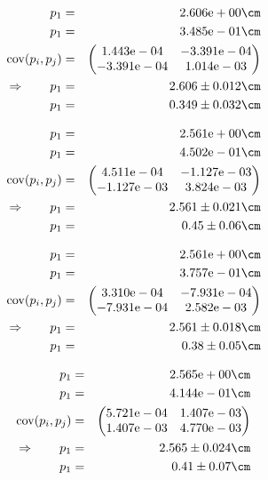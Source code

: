 \begin{eqnarray}
    p_1 &=& 2.606\mathrm{e}+00 \cm \nonumber \\
    p_1 &=& 3.485\mathrm{e}-01 \cm \nonumber \\
    \mathrm{cov}(p_i, p_j) &=& 
    \begin{pmatrix}
        1.443\mathrm{e}-04 &-3.391\mathrm{e}-04 \\
        -3.391\mathrm{e}-04 &1.014\mathrm{e}-03 \\
    \end{pmatrix}
\\ \Rightarrow \qquad
    p_1 &=& 2.606 \pm 0.012 \cm\\
    p_1 &=& 0.349 \pm 0.032 \cm
\end{eqnarray}

\begin{eqnarray}
    p_1 &=& 2.561\mathrm{e}+00 \cm \nonumber \\
    p_1 &=& 4.502\mathrm{e}-01 \cm \nonumber \\
    \mathrm{cov}(p_i, p_j) &=& 
    \begin{pmatrix}
        4.511\mathrm{e}-04 &-1.127\mathrm{e}-03 \\
        -1.127\mathrm{e}-03 &3.824\mathrm{e}-03 \\
    \end{pmatrix}
\\ \Rightarrow \qquad
    p_1 &=& 2.561 \pm 0.021 \cm\\
    p_1 &=& 0.45 \pm 0.06 \cm
\end{eqnarray}

\begin{eqnarray}
    p_1 &=& 2.561\mathrm{e}+00 \cm \nonumber \\
    p_1 &=& 3.757\mathrm{e}-01 \cm \nonumber \\
    \mathrm{cov}(p_i, p_j) &=& 
    \begin{pmatrix}
        3.310\mathrm{e}-04 &-7.931\mathrm{e}-04 \\
        -7.931\mathrm{e}-04 &2.582\mathrm{e}-03 \\
    \end{pmatrix}
\\ \Rightarrow \qquad
    p_1 &=& 2.561 \pm 0.018 \cm\\
    p_1 &=& 0.38 \pm 0.05 \cm
\end{eqnarray}

\begin{eqnarray}
    p_1 &=& 2.565\mathrm{e}+00 \cm \nonumber \\
    p_1 &=& 4.144\mathrm{e}-01 \cm \nonumber \\
    \mathrm{cov}(p_i, p_j) &=& 
    \begin{pmatrix}
        5.721\mathrm{e}-04 &1.407\mathrm{e}-03 \\
        1.407\mathrm{e}-03 &4.770\mathrm{e}-03 \\
    \end{pmatrix}
\\ \Rightarrow \qquad
    p_1 &=& 2.565 \pm 0.024 \cm\\
    p_1 &=& 0.41 \pm 0.07 \cm
\end{eqnarray}

